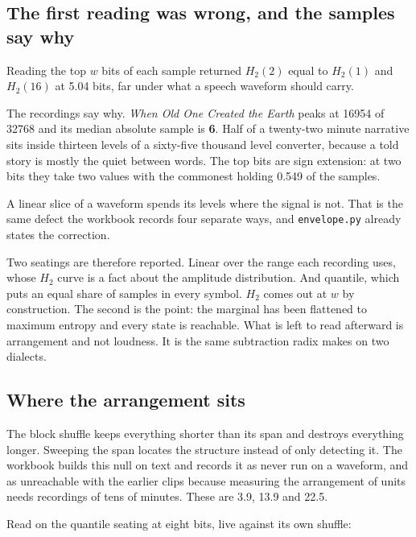 \subsection{The first reading was wrong, and the samples say why}

Reading the top \(w\) bits of each sample returned \(H_2(2)\) equal to \(H_2(1)\) and \(H_2(16)\) at
5.04 bits, far under what a speech waveform should carry.

The recordings say why. \emph{When Old One Created the Earth} peaks at 16954 of 32768 and its median
absolute sample is \textbf{6}. Half of a twenty-two minute narrative sits inside thirteen levels of a
sixty-five thousand level converter, because a told story is mostly the quiet between words. The top
bits are sign extension: at two bits they take two values with the commonest holding 0.549 of the
samples.

A linear slice of a waveform spends its levels where the signal is not. That is the same defect the
workbook records four separate ways, and \texttt{envelope.\allowbreak{}py} already states the
correction.

Two seatings are therefore reported. Linear over the range each recording uses, whose \(H_2\) curve
is a fact about the amplitude distribution. And quantile, which puts an equal share of samples in
every symbol. \(H_2\) comes out at \(w\) by construction. The second is the point: the marginal
has been flattened to maximum entropy and every state is reachable. What is left to read
afterward is arrangement and not loudness. It is the same subtraction radix makes on two dialects.

\subsection{Where the arrangement sits}

The block shuffle keeps everything shorter than its span and destroys everything longer. Sweeping
the span locates the structure instead of only detecting it. The workbook builds this null on text and
records it as never run on a waveform, and as unreachable with the earlier clips because measuring
the arrangement of units needs recordings of tens of minutes. These are 3.9, 13.9 and 22.5.

Read on the quantile seating at eight bits, live against its own shuffle:

